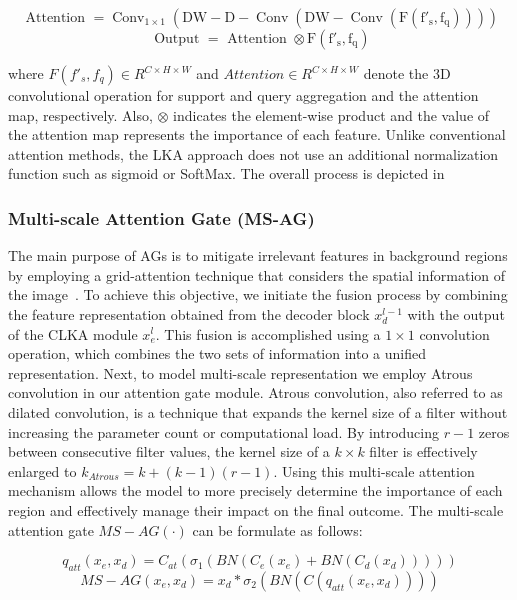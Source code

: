 \documentclass[runningheads]{llncs}
\begin{document}
\begin{equation}
\text { Attention }=\operatorname{Conv}_{1 \times 1}(\mathrm{DW}-\mathrm{D}{-}\operatorname{Conv}(\mathrm{DW}{-}\operatorname{Conv}(\mathrm{{F(f'_s, f_q)}})))
\end{equation}
\begin{equation}
\text { Output }=\text { Attention } \otimes \mathrm{{F(f'_s, f_q)}}
\end{equation}

\noindent where $F(f'_s, f_q) \in {R}^{C \times H \times W}$ and $Attention \in {R}^{C \times H \times W}$ denote the 3D convolutional operation for support and query aggregation and the attention map, respectively. Also, $\otimes$ indicates the element-wise product and the value of the attention map represents the importance of each feature. Unlike conventional attention methods, the LKA approach does not use an additional normalization function such as sigmoid or SoftMax. The overall process is depicted in 

\subsubsection{Multi-scale Attention Gate (MS-AG)}
The main purpose of AGs is to mitigate irrelevant features in background regions by employing a grid-attention technique that considers the spatial information of the image~\cite{oktay2018attention}. 
To achieve this objective, we initiate the fusion process by combining the feature representation obtained from the decoder block $x_d^{l-1}$ with the output of the CLKA module $x_e^l$. This fusion is accomplished using a $1{\times}1$ convolution operation, which combines the two sets of information into a unified representation.
Next, to model multi-scale representation we employ Atrous convolution in our attention gate module. Atrous convolution, also referred to as dilated convolution, is a technique that expands the kernel size of a filter without increasing the parameter count or computational load. By introducing $r-1$ zeros between consecutive filter values, the kernel size of a $k \times k$ filter is effectively enlarged to $k_{Atrous} = k + (k-1)(r-1)$. 
Using this multi-scale attention mechanism allows the model to more precisely determine the importance of each region and effectively manage their impact on the final outcome. 
The multi-scale attention gate $MS{-}AG (\cdot)$ can be formulate as follows:

\begin{equation}
q_{a t t}(x_e, x_d)=C_{at}(\sigma_1\left(B N\left(C_e(x_e)+B N\left(C_d(x_d)\right)\right)\right))
\end{equation}
\begin{equation}
MS{-}A G(x_e, x_d)=x_d * \sigma_2\left(B N\left(C\left(q_{a t t}(x_e, x_d)\right)\right)\right)
\end{equation}
\end{document}

